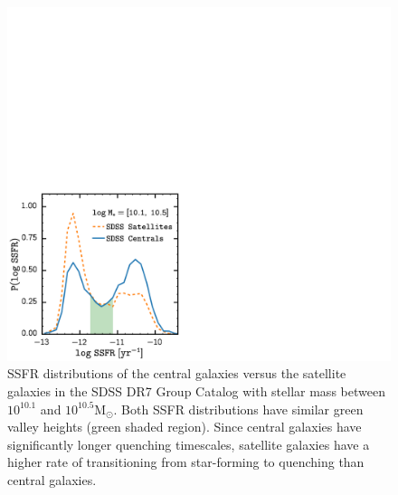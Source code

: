 \begin{figure}
\begin{center}
\includegraphics[width=\textwidth]{figs/cenq/SSFR_SDSS.pdf}
\caption{SSFR distributions of the central galaxies
versus the satellite galaxies in the SDSS DR7 Group Catalog with
stellar mass between $10^{10.1}$ and $10^{10.5}\mathrm{M}_\odot$. 
Both SSFR distributions have similar green valley heights 
(green shaded region). Since
central galaxies have significantly longer quenching timescales, 
satellite galaxies have a higher rate of transitioning from 
star-forming to quenching than central galaxies.}
\label{fig:sdss_censat_ssfr}
\end{center}
\end{figure}



